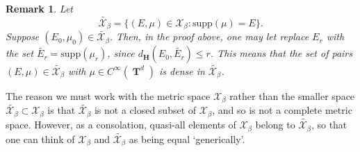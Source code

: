 \documentclass[dvipsnames,letterpaper,12pt]{article}
\numberwithin{equation}{section}
\DeclareMathOperator{\TT}{\mathbf{T}}
\newtheorem{remark}[theorem]{Remark}
\numberwithin{theorem}{section}
\begin{document}
\begin{remark} \label{remarkDOIWJDIOWJ2}
    Let
    \[ \tilde{\mathcal{X}_\beta} = \{ (E,\mu) \in \mathcal{X}_\beta : \text{supp}(\mu) = E \}. \]
    Suppose $(E_0,\mu_0) \in \tilde{\mathcal{X}_\beta}$. Then, in the proof above, one may let replace $E_r$ with the set $\tilde{E_r} = \text{supp}(\mu_r)$, since $d_{\mathbf{H}}(E_0,\tilde{E_r}) \leq r$. This means that the set of pairs $(E,\mu) \in \tilde{\mathcal{X}_\beta}$ with $\mu \in C^\infty(\TT^d)$ is dense in $\tilde{\mathcal{X}_\beta}$.
\end{remark}

The reason we must work with the metric space $\mathcal{X}_\beta$ rather than the smaller space $\tilde{\mathcal{X}_\beta} \subset \mathcal{X}_\beta$ is that $\tilde{\mathcal{X}_\beta}$ is not a closed subset of $\mathcal{X}_\beta$, and so is not a complete metric space. However, as a consolation, quasi-all elements of $\mathcal{X}_\beta$ belong to $\tilde{\mathcal{X}_\beta}$, so that one can think of $\mathcal{X}_\beta$ and $\tilde{\mathcal{X}_\beta}$ as being equal `generically'.
\end{document}
